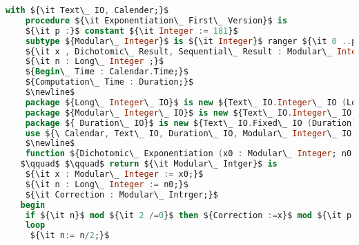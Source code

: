\begin{lstlisting}[mathescape=true, language=Ada, basicstyle=\small, frame=lrt]
    with ${\it Text\_ IO, Calender;}$
    procedure ${\it Exponentiation\_ First\_ Version}$ is
    ${\it p :}$ constant ${\it Integer := 181}$
    subtype ${Modular\_ Integer}$ is ${\it Integer}$ ranger ${\it 0 ..p-1}$ 
    ${\it x , Dichotomic\_ Result, Sequential\_ Result : Modular\_ Integer;}$
    ${\it n : Long\_ Integer ;}$
    ${Begin\_ Time : Calendar.Time;}$
    ${Computation\_ Time : Duration;}$
    $\newline$
    package ${Long\_ Integer\_ IO}$ is new ${Text\_ IO.Integer\_ IO (Long\_ Integer);}$
    package ${Modular\_ Integer\_ IO}$ is new ${Text\_ IO.Integer\_ IO (Modular\_ Integer);}$
    package ${ Duration\_ IO}$ is new ${Text\_ IO.Fixed\_ IO (Duration);}$
    use ${\ Calendar, Text\_ IO, Duration\_ IO, Modular\_ Integer\_ IO, Long\_ Integer\_ IO;}$
    $\newline$
    function ${Dichotomic\_ Exponentiation (x0 : Modular\_ Integer; n0 : Long\_ Integer)}$
   $\qquad$ $\qquad$ return ${\it Modular\_ Intger}$ is
    ${\it x : Modular\_ Integer := x0;}$
    ${\it n : Long\_ Integer := n0;}$
    ${\it Correction : Modular\_ Intrger;}$
   begin
    if ${\it n}$ mod ${\it 2 /=0}$ then ${Correction :=x}$ mod ${\it p;}$ else ${\it Correction := 1;}$ end if;
    loop
     ${\it n:= n/2;}$
 
   \end{lstlisting} 

